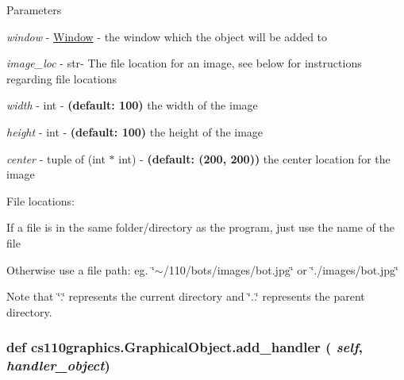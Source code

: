 \begin{DoxyParams}{Parameters}
\item[{\em window}]-\/ \hyperlink{classcs110graphics_1_1Window}{Window} -\/ the window which the object will be added to \item[{\em image\_\-loc}]-\/ str-\/ The file location for an image, see below for instructions regarding file locations \item[{\em width}]-\/ int -\/ {\bfseries (default: 100)} the width of the image \item[{\em height}]-\/ int -\/ {\bfseries (default: 100)} the height of the image \item[{\em center}]-\/ tuple of (int $\ast$ int) -\/ {\bfseries (default: (200, 200))} the center location for the image\end{DoxyParams}
File locations:
\begin{DoxyItemize}
\item If a file is in the same folder/directory as the program, just use the name of the file
\item Otherwise use a file path: eg. \char`\"{}$\sim$/110/bots/images/bot.jpg\char`\"{} or \char`\"{}./images/bot.jpg\char`\"{}
\end{DoxyItemize}

Note that \char`\"{}.\char`\"{} represents the current directory and \char`\"{}..\char`\"{} represents the parent directory. \hypertarget{classcs110graphics_1_1GraphicalObject_adb1af0d5a6baae3f9a08d21a3227c49f}{
\subsubsection[{add\_\-handler}]{\setlength{\rightskip}{0pt plus 5cm}def cs110graphics.GraphicalObject.add\_\-handler ( {\em self}, \/   {\em handler\_\-object})}}
\label{classcs110graphics_1_1GraphicalObject_adb1af0d5a6baae3f9a08d21a3227c49f}


